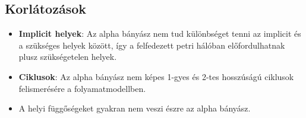 \subsection{Korlátozások}
\begin{itemize}
\item \textbf{Implicit helyek}: Az alpha bányász nem tud különbséget tenni az implicit és a szükséges helyek között, így a felfedezett petri hálóban előfordulhatnak plusz szükségetelen helyek.
\item \textbf{Ciklusok}: Az alpha bányász nem képes 1-gyes és 2-tes hosszúságú ciklusok felismerésére a folyamatmodellben.
\item A helyi függőségeket gyakran nem veszi észre az alpha bányász.
\end{itemize}





